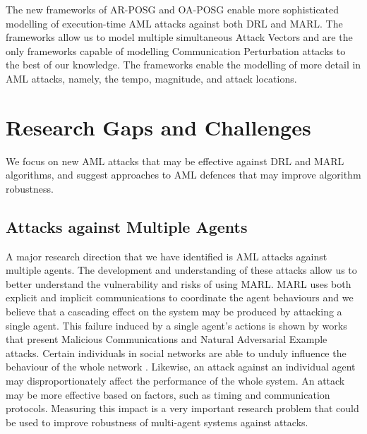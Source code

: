 \documentclass[conference,compsoc]{IEEEtran}
\begin{document}
The new frameworks of AR-POSG and OA-POSG enable more sophisticated modelling of execution-time AML attacks against both DRL and MARL. The frameworks allow us to model multiple simultaneous Attack Vectors and are the only frameworks capable of modelling Communication Perturbation attacks to the best of our knowledge. The frameworks enable the modelling of more detail in AML attacks, namely, the tempo, magnitude, and attack locations.


\section{Research Gaps and Challenges}
We focus  on  new AML attacks that may be effective against DRL and MARL algorithms, and suggest approaches to AML defences  that may improve  algorithm robustness.

\subsection{Attacks against Multiple Agents}
A major research direction that we have identified is AML attacks against multiple agents. The development and understanding of these attacks allow us to better understand the vulnerability and risks of using MARL. MARL uses both explicit \cite{foerster_learning_2016-1} and implicit communications \cite{gupta_cooperative_2017} to coordinate the agent behaviours and we believe that a cascading effect on the system may be produced by attacking a single agent. This failure induced by a single agent's actions is shown by works that present Malicious Communications \cite{tu_adversarial_2021, xue_mis-spoke_2022} and Natural Adversarial Example \cite{uesato_adversarial_2018, fujimoto_adversarial_2021, guo_adversarial_2021, pan_improving_2021, phan_learning_2020, gleave_adversarial_2020} attacks. Certain individuals in social networks are able to unduly influence the behaviour of the whole network \cite{yang_efficient_2016}. Likewise, an attack against an individual agent  may disproportionately affect the performance of the whole system. An attack may be more effective based on factors, such as timing and communication protocols. Measuring this impact is a very important research problem that could be used to improve robustness of multi-agent systems against attacks.
\end{document}
